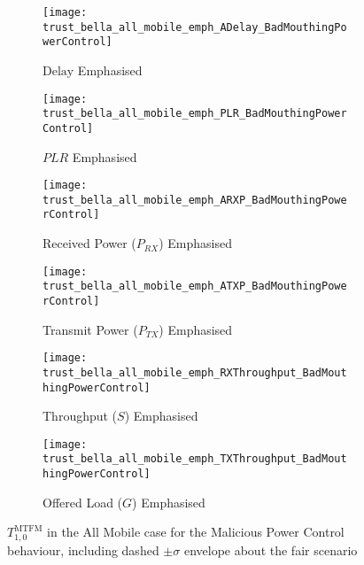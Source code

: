\begin{figure}[h]
	\centering
	\begin{subfigure}{0.45\textwidth}
		\texttt{[image: trust\_bella\_all\_mobile\_emph\_ADelay\_BadMouthingPowerControl]} 
		\caption{$\text{Delay}$ Emphasised}
		\label{fig:all_mobile_badmouthing_delay}
	\end{subfigure}
	\begin{subfigure}{0.45\textwidth}
		\texttt{[image: trust\_bella\_all\_mobile\_emph\_PLR\_BadMouthingPowerControl]} 
		\caption{$PLR$ Emphasised}
		\label{fig:all_mobile_badmouthing_plr}
	\end{subfigure}
	
	\begin{subfigure}{0.45\textwidth}
		\texttt{[image: trust\_bella\_all\_mobile\_emph\_ARXP\_BadMouthingPowerControl]} 
		\caption{Received Power ($P_{RX}$) Emphasised}
		\label{fig:all_mobile_badmouthing_rxp}
	\end{subfigure}	
	\begin{subfigure}{0.45\textwidth}
		\texttt{[image: trust\_bella\_all\_mobile\_emph\_ATXP\_BadMouthingPowerControl]} 
		\caption{Transmit Power ($P_{TX}$) Emphasised}
		\label{fig:all_mobile_badmouthing_txp}
	\end{subfigure}
	
	\begin{subfigure}{0.45\textwidth}
		\texttt{[image: trust\_bella\_all\_mobile\_emph\_RXThroughput\_BadMouthingPowerControl]} 
		\caption{Throughput ($S$) Emphasised}
		\label{fig:all_mobile_badmouthing_rxthroughput}
	\end{subfigure}
	\begin{subfigure}{0.45\textwidth}
		\texttt{[image: trust\_bella\_all\_mobile\_emph\_TXThroughput\_BadMouthingPowerControl]} 
		\caption{Offered Load ($G$) Emphasised}
		\label{fig:all_mobile_badmouthing_txthroughput}
	\end{subfigure}
	\caption{$T_{1,0}^\text{MTFM}$ in the All Mobile case for the Malicious Power Control behaviour, including dashed $\pm\sigma$ envelope about the fair scenario}
	\label{fig:all_mobile_badmouthing}
\end{figure}
%
